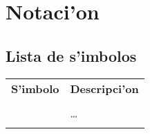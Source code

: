 
\ifenglish
  \def\notationname{Notation}
  \def\notationsymb{Symbol}
  \def\notationdesc{Description}
  \def\notationlist{List of Symbols}
\else
  \def\notationname{Notaci'on}
  \def\notationsymb{S'imbolo}
  \def\notationdesc{Descripci'on}
  \def\notationlist{Lista de s'imbolos}
\fi

\chapter{\notationname}
\label{appendix:notation}

\section{\notationlist}

{\footnotesize

\begin{longtable}[l]{cl}
{\bfseries \notationsymb} & {\bfseries \notationdesc} \\ 
\\
\endhead
 & \hfill \ldots \\ 
\endfoot
\endlastfoot



\end{longtable}
}

\endinput
%

